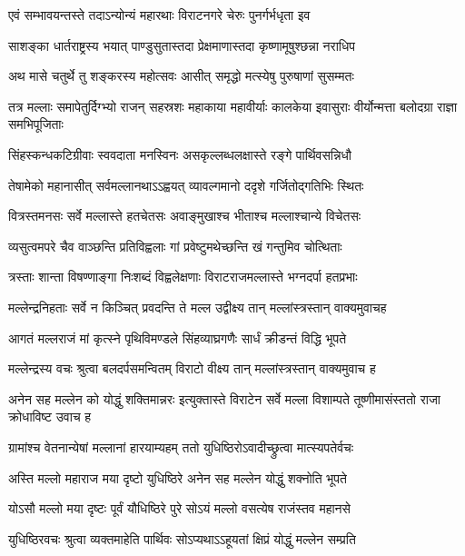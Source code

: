 \twolineshloka
{एवं सम्भावयन्तस्ते तदाऽन्योन्यं महारथाः}
{विराटनगरे चेरुः पुनर्गर्भधृता इव}


\twolineshloka
{साशङ्का धार्तराष्ट्रस्य भयात् पाण्डुसुतास्तदा}
{प्रेक्षमाणास्तदा कृष्णामूषुश्छन्ना नराधिप}


\twolineshloka
{अथ मासे चतुर्थे तु शङ्करस्य महोत्सवः}
{आसीत् समृद्धो मत्स्येषु पुरुषाणां सुसम्मतः}


\onelineshloka
{तत्र मल्लाः समापेतुर्दिग्भ्यो राजन् सहस्रशः}
\twolineshloka
{महाकाया महावीर्याः कालकेया इवासुराः}
{वीर्योन्मत्ता बलोदग्रा राज्ञा समभिपूजिताः}


\twolineshloka
{सिंहस्कन्धकटिग्रीवाः स्ववदाता मनस्विनः}
{असकृल्लब्धलक्षास्ते रङ्गे पार्थिवसन्निधौ}


\twolineshloka
{तेषामेको महानासीत् सर्वमल्लानथाऽऽह्वयत्}
{व्यावल्गमानो ददृशे गर्जितोद्गतिभिः स्थितः}


\twolineshloka
{वित्रस्तमनसः सर्वे मल्लास्ते हतचेतसः}
{अवाङ्मुखाश्च भीताश्च मल्लाश्चान्ये विचेतसः}


\twolineshloka
{व्यसुत्वमपरे चैव वाञ्छन्ति प्रतिविह्वलाः}
{गां प्रवेष्टुमथेच्छन्ति खं गन्तुमिव चोत्थिताः}


\twolineshloka
{त्रस्ताः शान्ता विषण्णाङ्गा निःशब्दं विह्वलेक्षणाः}
{विराटराजमल्लास्ते भग्नदर्पा हतप्रभाः}


\twolineshloka
{मल्लेन्द्रनिहताः सर्वे न किञ्चित् प्रवदन्ति ते}
{मल्ल उद्वीक्ष्य तान् मल्लांस्त्रस्तान् वाक्यमुवाचह}


\twolineshloka
{आगतं मल्लराजं मां कृत्स्ने पृथिविमण्डले}
{सिंहव्याघ्रगणैः सार्धं क्रीडन्तं विद्धि भूपते}


\twolineshloka
{मल्लेन्द्रस्य वचः श्रुत्वा बलदर्पसमन्वितम्}
{विराटो वीक्ष्य तान् मल्लांस्त्रस्तान् वाक्यमुवाच ह}


\onelineshloka
{अनेन सह मल्लेन को योद्धुं शक्तिमान्नरः}
\twolineshloka
{इत्युक्तास्ते विराटेन सर्वे मल्ला विशाम्पते}
{तूष्णीमासंस्ततो राजा क्रोधाविष्ट उवाच ह}


\twolineshloka
{ग्रामांश्च वेतनान्येषां मल्लानां हारयाम्यहम्}
{ततो युधिष्ठिरोऽवादीच्छ्रुत्वा मात्स्यपतेर्वचः}


\twolineshloka
{अस्ति मल्लो महाराज मया दृष्टो युधिष्ठिरे}
{अनेन सह मल्लेन योद्धुं शक्नोति भूपते}


\twolineshloka
{योऽसौ मल्लो मया दृष्टः पूर्वं यौधिष्ठिरे पुरे}
{सोऽयं मल्लो वसत्येष राजंस्तव महानसे}



\twolineshloka
{युधिष्ठिरवचः श्रुत्वा व्यक्तमाहेति पार्थिवः}
{सोऽप्यथाऽऽहूयतां क्षिप्रं योद्धुं मल्लेन सम्प्रति}


